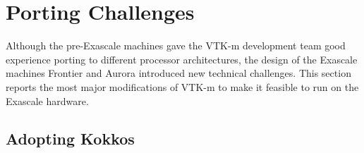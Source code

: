 \section{Porting Challenges}

Although the pre-Exascale machines gave the VTK-m development team good experience porting to different processor architectures, the design of the Exascale machines Frontier and Aurora introduced new technical challenges.
This section reports the most major modifications of VTK-m to make it feasible to run on the Exascale hardware.


\subsection{Adopting Kokkos}


